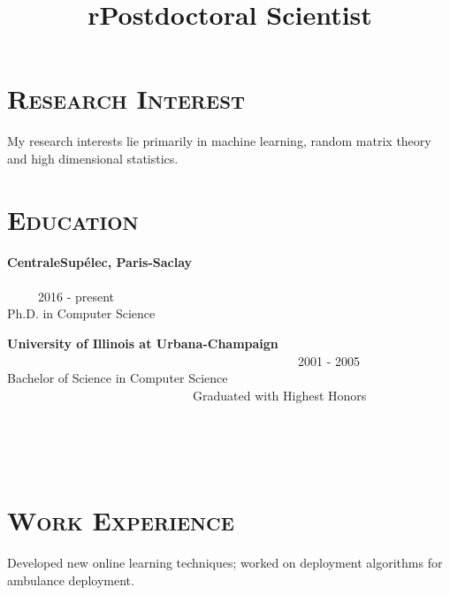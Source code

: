 \begin{resume}




\section{\textsc{Research Interest}}
My research interests lie primarily in machine learning, random matrix theory and high dimensional statistics. 

\section{\textsc{Education}}

\textbf{CentraleSup\'elec, Paris-Saclay} \ \ \ \ \ \ \ \ \ \ \ \ \ \ \ \ \ \ \ \ \ \ \ \ \ \ \ \ \ \ \ \ \ \ \ \ \ \ \ \ \ \ \ \ \ \ \ \ \ \ \ \ \ \ \ \ \ \ \ \ \ \ \ \ \ \ \ \ \ \ \ \ \ \ \ \ \ 2016 - present \\
Ph.D. in Computer Science

\textbf{University of Illinois at Urbana-Champaign} \ \ \ \ \ \ \ \ \ \ \ \ \ \ \ \ \ \ \ \ \ \ \ \ \ \ \ \ \ \ \ \ \ \ \ \ \ \ \ \ \ \ \ \ \ \ \ 2001 - 2005 \\ 
Bachelor of Science in Computer Science \ \ \ \ \ \ \ \ \ \ \ \ \ \ \ \ \ \ \ \ \ \ \ \ \ \ \ \ \ \ Graduated with Highest Honors




\begin{formatb}
  \title{r}\\
  \\
  \body\\
\end{formatb}

\section{\textsc{Work Experience}}

\title{Postdoctoral Scientist}
\begin{position}
Developed new online learning techniques; worked on deployment algorithms for ambulance deployment.
\end{position}



\end{resume}
